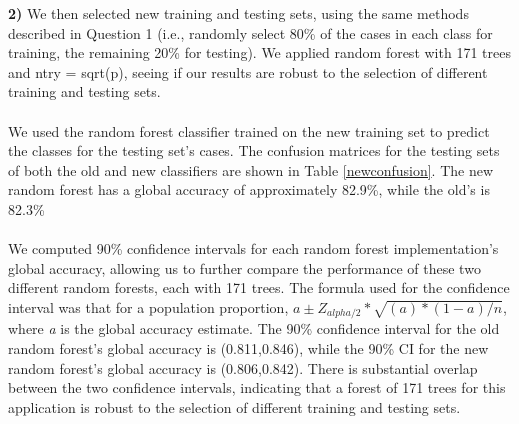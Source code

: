 \documentclass{homework}
\begin{document}
\textbf{2)} We then selected new training and testing sets, using the same methods described in Question 1 (i.e., randomly select 80\% of the cases in each class for training, the remaining 20\% for testing). We applied random forest with 171 trees and ntry = sqrt(p), seeing if our results are robust to the selection of different training and testing sets.\\\\ 
We used the random forest classifier trained on the new training set to predict the classes for the testing set's cases. The confusion matrices for the testing sets of both the old and new classifiers are shown in Table \ref{newconfusion}. The new random forest has a global accuracy of approximately 82.9\%, while the old's is 82.3\%\\\\ 
We computed 90\% confidence intervals for each random forest implementation's global accuracy, allowing us to further compare the performance of these two different random forests, each with 171 trees. The formula used for the confidence interval was that for a population proportion, \begin{math} a \pm Z_{alpha/2} * \sqrt{(a)*(1-a)/n}\end{math}, where \textit{a} is the global accuracy estimate. The 90\% confidence interval for the old random forest's global accuracy is (0.811,0.846), while the 90\% CI for the new random forest's global accuracy is (0.806,0.842). There is substantial overlap between the two confidence intervals, indicating that a forest of 171 trees for this application is robust to the selection of different training and testing sets.

\begin{table}[H]
    \centering
        \\
    \caption{Confusion Matrices for Different Testing Sets with 171 Tree Random Forest}
    \label{newconfusion}
\end{table}
\end{document}
